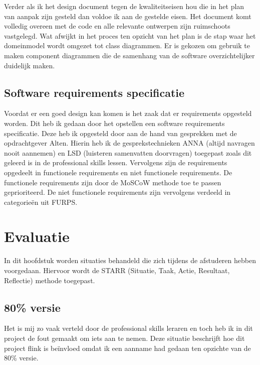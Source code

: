 \documentclass[a4paper, 11pt, oneside]{report}
\begin{document}
Verder als ik het design document tegen de kwaliteitseisen hou die in het plan van aanpak zijn gesteld dan voldoe ik aan de gestelde eisen. Het document komt volledig overeen met de code en alle relevante ontwerpen zijn ruimschoots vastgelegd. Wat afwijkt in het proces ten opzicht van het plan is de stap waar het domeinmodel wordt omgezet tot class diagrammen. Er is gekozen om gebruik te maken component diagrammen die de samenhang van de software overzichtelijker duidelijk maken. 

\section{Software requirements specificatie}\label{sec:software-requirements-specificatie}
Voordat er een goed design kan komen is het zaak dat er requirements opgesteld worden.
Dit heb ik gedaan door het opstellen een software requirements specificatie.  
Deze heb ik opgesteld door aan de hand van gesprekken met de opdrachtgever Alten.
Hierin heb ik de gesprekstechnieken ANNA (altijd navragen nooit aannemen) en LSD (luisteren samenvatten doorvragen) toegepast zoals dit geleerd is in de professional skills lessen.  
Vervolgens zijn de requirements opgedeelt in functionele requirements en niet functionele requirements. 
De functionele requirements zijn door de MoSCoW methode toe te passen geprioriteerd.
De niet functionele requirements zijn vervolgens verdeeld in categorieën uit FURPS. 
 
\chapter{Evaluatie}\label{sec:evaluatie}
In dit hoofdstuk worden situaties behandeld die zich tijdens de afstuderen hebben voorgedaan. 
Hiervoor wordt de STARR (Situatie, Taak, Actie, Resultaat, Reflectie) methode toegepast. 

\section{80\% versie}\label{sec:altijd-navragen-nooit-aannemen}
Het is mij zo vaak verteld door de professional skills leraren en toch heb ik in dit project de fout gemaakt om iets aan te nemen.
Deze situatie beschrijft hoe dit project flink is beïnvloed omdat ik een aanname had gedaan ten opzichte van de 80\% versie.
\end{document}
